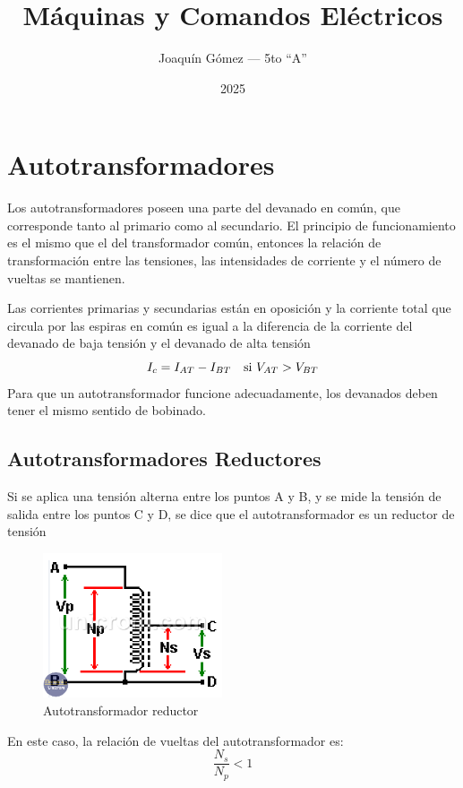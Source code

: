 \documentclass[11pt]{report}
\title{Máquinas y Comandos Eléctricos}
\author{Joaquín Gómez --- 5to ``A''}
\date{2025}
\begin{document}
\maketitle

\chapter{Autotransformadores}
Los autotransformadores poseen una parte del devanado en común, que corresponde tanto al 
primario como al secundario. 
El principio de funcionamiento es el mismo que el del transformador común, entonces la relación de 
transformación entre las tensiones, las intensidades de corriente y el número de vueltas se mantienen.

Las corrientes primarias y secundarias están en oposición y la corriente total que circula por las espiras
en común es igual a la diferencia de la corriente del devanado de baja tensión y el devanado de alta tensión
\begin{equation}
    I_c = I_{AT} - I_{BT} \quad \textnormal{si } V_{AT} > V_{BT}   
\end{equation}
Para que un autotransformador funcione adecuadamente, los devanados deben tener el mismo sentido de bobinado.

\section{Autotransformadores Reductores}
Si se aplica una tensión alterna entre los puntos A y B, y se mide la tensión de salida entre los puntos C y D,
se dice que el autotransformador es un reductor de tensión

\begin{figure}[h]
    \begin{center}
        \includegraphics[width=200px]{autotransformador-reductor.png}
    \end{center}
    \caption{Autotransformador reductor}
\end{figure}

En este caso, la relación de vueltas del autotransformador es:
\begin{equation}
    \frac{N_s}{N_p} < 1 
\end{equation}
\end{document}
